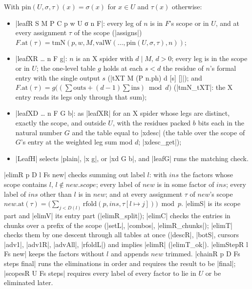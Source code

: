 \begin{definition}\label{def:lean-core-leafR}
With $\mathrm{pin}(U,\sigma,\tau)(x)=\sigma(x)$ for $x\in U$ and $\tau(x)$ otherwise:
\begin{itemize}
\item \lean|leafR S M P C p w U σ n F|: every leg of $n$ is in $F$'s scope or in $U$, and at every assignment $\tau$ of the scope (\lean|assigns|) $F.\mathrm{at}(\tau)=\mathrm{tmN}(p,w,M,\mathrm{valW}(\ldots,\mathrm{pin}(U,\sigma,\tau),n))$;
\item \lean|leafXR … n F g|: $n$ is an X spider with $d\mid M$, $d>0$; every leg is in the scope or in $U$; the one-level table $g$ holds at each $s<d$ the residue of $n$'s formal entry with the single output $s$ (\lean|tXT M (P n.ph) d [s] []|); and $F.\mathrm{at}(\tau)=g\bigl((\sum\mathrm{outs}+(d-1)\sum\mathrm{ins})\bmod d\bigr)$ (\lean|tmN_tXT|: the X entry reads its legs only through that sum);
\item \lean|leafXD … n F G b|: as \lean|leafXR| for an X spider whose legs are distinct, exactly the scope, and outside $U$, with the residues packed $b$ bits each in the natural number $G$ and the table equal to \lean|xdesc| (the table over the scope of $G$'s entry at the weighted leg sum mod $d$; \lean|xdesc_get|);
\item \lean|LeafH| selects \lean|plain|, \lean|x g|, or \lean|xd G b|, and \lean|leafG| runs the matching check.
\end{itemize}
\lean|elimR p D l Fs new| checks summing out label $l$: with $\mathit{ins}$ the factors whose scope contains $l$, $l\notin\mathit{new.scope}$; every label of $\mathit{new}$ is in some factor of $\mathit{ins}$; every label of $\mathit{ins}$ other than $l$ is in $\mathit{new}$; and at every assignment $\tau$ of $\mathit{new}$'s scope $\mathit{new}.\mathrm{at}(\tau)=\bigl(\sum_{j<D(l)}\mathrm{rfold}(p,\mathit{ins},\tau[l\mapsto j])\bigr)\bmod p$. \lean|elimS| is its scope part and \lean|elimV| its entry part (\lean|elimR_split|); \lean|elimC| checks the entries in chunks over a prefix of the scope (\lean|setL|, \lean|combos|, \lean|elimR_chunks|); \lean|elimT| checks them by one descent through all tables at once (\lean|descR|, \lean|botS|, cursors \lean|adv1|, \lean|adv1R|, \lean|advAll|, \lean|rfoldL|) and implies \lean|elimR| (\lean|elimT_ok|). \lean|elimStepR l Fs new| keeps the factors without $l$ and appends $\mathit{new}$ trimmed. \lean|chainR p D Fs steps final| runs the eliminations in order and requires the result to be \lean|final|; \lean|scopesR U Fs steps| requires every label of every factor to lie in $U$ or be eliminated later.
\end{definition}

